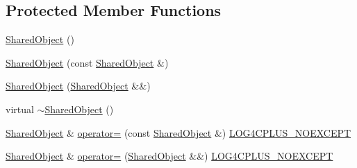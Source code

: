 \subsection*{Protected Member Functions}
\begin{DoxyCompactItemize}
\item 
\hyperlink{classlog4cplus_1_1helpers_1_1SharedObject_a8d9e8bcd858c17db0b81930a96fe374e}{Shared\-Object} ()
\item 
\hyperlink{classlog4cplus_1_1helpers_1_1SharedObject_a091bbe60e18cb7796e8042a037a76779}{Shared\-Object} (const \hyperlink{classlog4cplus_1_1helpers_1_1SharedObject}{Shared\-Object} \&)
\item 
\hyperlink{classlog4cplus_1_1helpers_1_1SharedObject_a079103317d4cb69640f6130fc41bdbeb}{Shared\-Object} (\hyperlink{classlog4cplus_1_1helpers_1_1SharedObject}{Shared\-Object} \&\&)
\item 
virtual \hyperlink{classlog4cplus_1_1helpers_1_1SharedObject_a91f03b36309a311a7e13e625119be2ea}{$\sim$\-Shared\-Object} ()
\item 
\hyperlink{classlog4cplus_1_1helpers_1_1SharedObject}{Shared\-Object} \& \hyperlink{classlog4cplus_1_1helpers_1_1SharedObject_a09a839e1337e80057778d4922a74f3de}{operator=} (const \hyperlink{classlog4cplus_1_1helpers_1_1SharedObject}{Shared\-Object} \&) \hyperlink{config_8hxx_a77d156ef570ca81fe10eb864ea349506}{L\-O\-G4\-C\-P\-L\-U\-S\-\_\-\-N\-O\-E\-X\-C\-E\-P\-T}
\item 
\hyperlink{classlog4cplus_1_1helpers_1_1SharedObject}{Shared\-Object} \& \hyperlink{classlog4cplus_1_1helpers_1_1SharedObject_ae3c90474681f84c3e790d5cbbc800dac}{operator=} (\hyperlink{classlog4cplus_1_1helpers_1_1SharedObject}{Shared\-Object} \&\&) \hyperlink{config_8hxx_a77d156ef570ca81fe10eb864ea349506}{L\-O\-G4\-C\-P\-L\-U\-S\-\_\-\-N\-O\-E\-X\-C\-E\-P\-T}
\end{DoxyCompactItemize}


